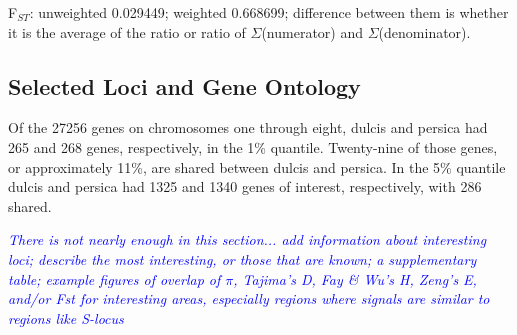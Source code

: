 \documentclass[12pt]{article}
\newcommand{\jri}[1]{\textcolor{red}{\emph{#1}}}
\newcommand{\dv}[1]{\textcolor{blue}{\emph{#1}}}
\begin{document}
F$_{ST}$: unweighted 0.029449; weighted 0.668699; difference between them is whether it is the average of the ratio or ratio of $\Sigma$(numerator) and $\Sigma$(denominator).

%
\subsection*{Selected Loci and Gene Ontology}
Of the 27256 genes on chromosomes one through eight, dulcis and persica had 265 and 268 genes, respectively, in the 1\% quantile. 
%
Twenty-nine of those genes, or approximately 11\%, are shared between dulcis and persica.
%
In the 5\% quantile dulcis and persica had 1325 and 1340 genes of interest, respectively, with 286 shared.
%

\dv{There is not nearly enough in this section... add information about interesting loci; describe the most interesting, or those that are known; a supplementary table; example figures of overlap of $\pi$, Tajima's D, Fay \& Wu's H, Zeng's E, and/or Fst for interesting areas, especially regions where signals are similar to regions like S-locus}
% 
%
\end{document}
